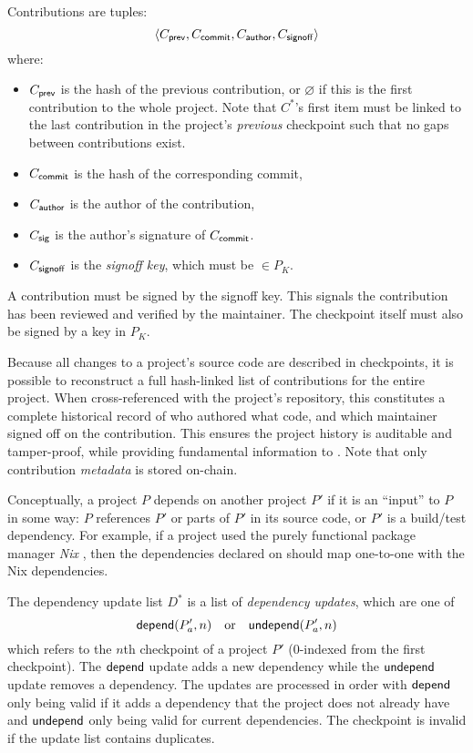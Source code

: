 Contributions are tuples:
\[
   \langle C_{\mathsf{prev}}, C_{\mathsf{commit}}, C_{\mathsf{author}}, C_{\mathsf{signoff}}\rangle
\]
where:
\begin{itemize}
\item $C_{\mathsf{prev}}$ is the hash of the previous contribution, or
  $\varnothing$ if this is the first contribution to the whole
  project. Note that $C^*$'s first item must be linked to the last
  contribution in the project's \emph{previous} checkpoint such that no
  gaps between contributions exist.
\item $C_{\mathsf{commit}}$ is the hash of the corresponding commit,
\item $C_{\mathsf{author}}$ is the author of the contribution,
\item $C_{\mathsf{sig}}$ is the author's signature of $C_{\mathsf{commit}}$.
\item $C_{\mathsf{signoff}}$ is the \emph{signoff key}, which must be $\in P_K$.
\end{itemize}
A contribution must be signed by the signoff key. This signals
the contribution has been reviewed and verified by the maintainer. The
checkpoint itself must also be signed by a key in $P_K$.

Because all changes to a project's source code are described in checkpoints, it
is possible to reconstruct a full hash-linked list of contributions for the
entire project. When cross-referenced with the project's repository, this
constitutes a complete historical record of who authored what code, and which
maintainer signed off on the contribution. This ensures the project history is
auditable and tamper-proof, while providing fundamental information to
\osrank{}. Note that only contribution \emph{metadata} is stored
on-chain.

\label{s:dependencies}
Conceptually, a project $P$ depends on another project $P'$ if it is an
``input'' to $P$ in some way: $P$ references $P'$ or parts of $P'$ in its
source code, or $P'$ is a build/test dependency.  For example, if a project
used the purely functional package manager \emph{Nix} \cite{nix}, then the
dependencies declared on \oscoin{} should map one-to-one with the Nix
dependencies.

The dependency update list $D^*$ is a list of \emph{dependency
  updates}, which are one of
\[
    \mathsf{depend}(P'_a, n) \quad \text{or} \quad \mathsf{undepend}(P'_a, n)
\]
which refers to the $n$th checkpoint of a project $P'$ ($0$-indexed
from the first checkpoint). The $\mathsf{depend}$ update adds a new dependency
while the $\mathsf{undepend}$ update removes a dependency. The updates are
processed in order with $\mathsf{depend}$ only being valid if it adds a
dependency that the project does not already have and $\mathsf{undepend}$
only being valid for current dependencies. The checkpoint is invalid
if the update list contains duplicates.

